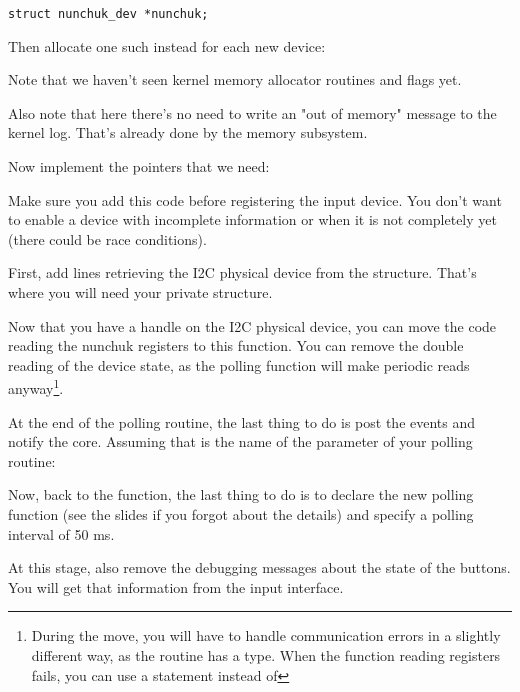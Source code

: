 \begin{verbatim}
struct nunchuk_dev *nunchuk;
\end{verbatim}

Then allocate one such instead for each new device:


Note that we haven't seen kernel memory allocator routines and flags
yet.

Also note that here there's no need to write an "out of memory"
message to the kernel log. That's already done by the memory subsystem.

Now implement the pointers that we need:


Make sure you add this code before registering the input device. You
don't want to enable a device with incomplete information or when it is
not completely yet (there could be race conditions).

First, add lines retrieving the I2C physical device from the
 structure. That's where you will need your
private  structure.

Now that you have a handle on the I2C physical device, you can move the
code reading the nunchuk registers to this function. You can
remove the double reading of the device state, as the polling function
will make periodic reads anyway\footnote{During the move, you will have
to handle communication errors in a slightly different way, as the
 routine has a  type. When the function
reading registers fails, you can use a  statement instead
of }.

At the end of the polling routine, the last thing to do is post the events
and notify the  core. Assuming that  is the
name of the  parameter of your polling routine:


Now, back to the  function, the last thing to do
is to declare the new polling function (see the slides if you forgot
about the details) and specify a polling interval of 50 ms.

At this stage, also remove the debugging messages about the state
of the buttons. You will get that information from the input interface.


